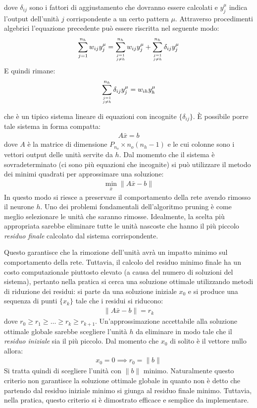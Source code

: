 dove $\delta_{ij}$ sono i fattori di aggiustamento che dovranno essere calcolati e $y_j^\mu$ indica l'output dell'unità $j$ corrispondente a un certo pattern $\mu$.
Attraverso procedimenti algebrici l'equazione precedente può essere riscritta nel seguente modo:
\begin{align*}
	\sum_{j = 1}^{n_h}  w_{ij} y^\mu_j = 
	\sum_{j = 1 \atop j \neq h} ^ {n_h} w_{ij} y^\mu_j + 
	\sum_{j = 1 \atop j \neq h} ^ {n_h} \delta_{ij} y^\mu_j
\end{align*}
E quindi rimane:
\begin{align*}
	\sum_{j = 1 \atop j \neq h} ^ {n_h} \delta_{ij} y^\mu_j =
	w_{ih} y^\mu_h
\end{align*}

che è un tipico sistema lineare di equazioni con incognite $\{\delta_{ij}\}$. È possibile porre tale sistema in forma compatta:
\begin{align*}
	A \bar{x} = b
\end{align*}
dove $A$ è la matrice di dimensione $P_{n_o} \times n_o (n_h - 1)$ e le cui colonne sono i vettori output delle unità servite da $h$. Dal momemto che il sistema è sovradeterminato (ci sono più equazioni che incognite) si può utilizzare il metodo dei minimi quadrati per approssimare una soluzione:
\begin{align}
	\min_{\bar{x}} \|A \bar{x} - b\|
\end{align}
In questo modo si riesce a preservare il comportamento della rete avendo rimosso il neurone $h$. Uno dei problemi fondamentali dell'algoritmo pruning è come meglio selezionare le unità che saranno rimosse. Idealmente, la scelta più appropriata sarebbe eliminare tutte le unità nascoste che hanno il più piccolo \emph{residuo finale} calcolato dal sistema corrispondente.

\newpage

Questo garantisce che la rimozione dell'unità avrà un impatto minimo sul comportamento della rete. Tuttavia, il calcolo del residuo minimo finale ha un costo computazionale piuttosto elevato (a causa del numero di soluzioni del sistema), pertanto nella pratica si cerca una soluzione ottimale utilizzando metodi di riduzione dei residui: si parte da una soluzione iniziale $x_0$ e si produce una sequenza di punti $\{ x_k \}$ tale che i residui si riducono: 
\begin{align*}
	\|A \bar{x} - b\| = r_k
\end{align*}
dove $r_0 \geq r_1 \geq \dots \geq r_k \geq r_{k + 1}$. Un'approssimazione accettabile alla soluzione ottimale globale sarebbe scegliere l'unità $h$ da eliminare in modo tale che il \emph{residuo iniziale} sia il più piccolo. Dal momento che $x_0$ di solito è il vettore nullo allora:
\begin{align*}
	x_0 = 0 \implies r_0 = \| b \|
\end{align*}
Si tratta quindi di scegliere l'unità con $\| b \|$ minimo. Naturalmente questo criterio non garantisce la soluzione ottimale globale in quanto non è detto che partendo dal residuo iniziale minimo si giunga al residuo finale minimo. Tuttavia, nella pratica, questo criterio si è dimostrato efficace e semplice da implementare.\\

